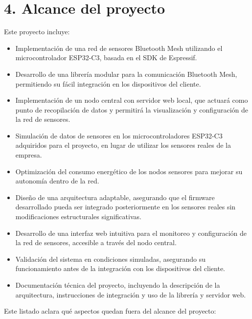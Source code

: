\documentclass[
11pt, %
]{charter}
\begin{document}
\section{4. Alcance del proyecto}
\label{sec:alcance}

Este proyecto incluye: 

\begin{itemize}
\item Implementación de una red de sensores Bluetooth Mesh utilizando el microcontrolador ESP32-C3, basada en el SDK de Espressif.
\item Desarrollo de una librería modular para la comunicación Bluetooth Mesh, permitiendo su fácil integración en los dispositivos del cliente.
\item Implementación de un nodo central con servidor web local, que actuará como punto de recopilación de datos y permitirá la visualización y configuración de la red de sensores.
\item Simulación de datos de sensores en los microcontroladores ESP32-C3 adquiridos para el proyecto, en lugar de utilizar los sensores reales de la empresa.
\item Optimización del consumo energético de los nodos sensores para mejorar su autonomía dentro de la red.
\item Diseño de una arquitectura adaptable, asegurando que el firmware desarrollado pueda ser integrado posteriormente en los sensores reales sin modificaciones estructurales significativas.
\item Desarrollo de una interfaz web intuitiva para el monitoreo y configuración de la red de sensores, accesible a través del nodo central.
\item Validación del sistema en condiciones simuladas, asegurando su funcionamiento antes de la integración con los dispositivos del cliente.
\item Documentación técnica del proyecto, incluyendo la descripción de la arquitectura, instrucciones de integración y uso de la librería y servidor web.

\end{itemize}



Este listado aclara qué aspectos quedan fuera del alcance del proyecto:
\end{document}
